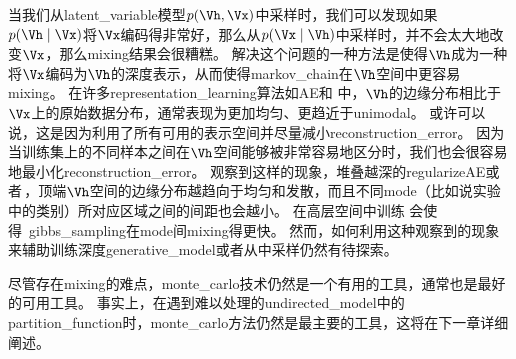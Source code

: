当我们从\gls{latent_variable}模型$p(\Vh,\Vx)$中采样时，我们可以发现如果$p(\Vh\mid \Vx)$将$\Vx$编码得非常好，那么从$p(\Vx \mid \Vh)$中采样时，并不会太大地改变$\Vx$，那么\gls{mixing}结果会很糟糕。
解决这个问题的一种方法是使得$\Vh$成为一种将$\Vx$编码为$\Vh$的深度表示，从而使得\gls{markov_chain}在$\Vh$空间中更容易\gls{mixing}。
在许多\gls{representation_learning}算法如\gls{AE}和\,\,中，$\Vh$的边缘分布相比于$\Vx$上的原始数据分布，通常表现为更加均匀、更趋近于\gls{unimodal}。
或许可以说，这是因为利用了所有可用的表示空间并尽量减小\gls{reconstruction_error}。
因为当训练集上的不同样本之间在$\Vh$空间能够被非常容易地区分时，我们也会很容易地最小化\gls{reconstruction_error}。
\citet{Bengio-et-al-ICML2013-small}观察到这样的现象，堆叠越深的\gls{regularize}\gls{AE}或者\,，顶端$\Vh$空间的边缘分布越趋向于均匀和发散，而且不同\gls{mode}（比如说实验中的类别）所对应区域之间的间距也会越小。
在高层空间中训练\,\,会使得~\gls{gibbs_sampling}在\gls{mode}间\gls{mixing}得更快。
然而，如何利用这种观察到的现象来辅助训练深度\gls{generative_model}或者从中采样仍然有待探索。

尽管存在\gls{mixing}的难点，\gls{monte_carlo}技术仍然是一个有用的工具，通常也是最好的可用工具。  
事实上，在遇到难以处理的\gls{undirected_model}中的\gls{partition_function}时，\gls{monte_carlo}方法仍然是最主要的工具，这将在下一章详细阐述。
